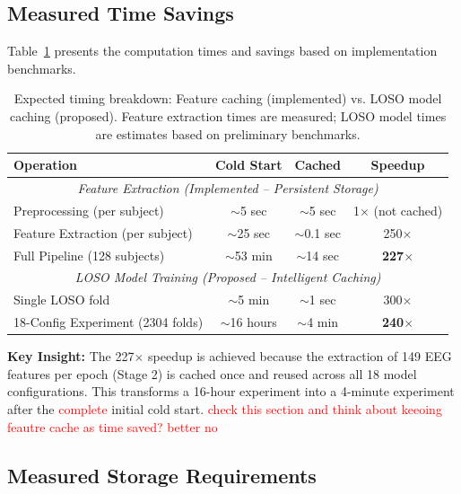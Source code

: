 \documentclass{imc-inf} %
\begin{document}
\subsection{Measured Time Savings}

Table~\ref{tab:expected_time} presents the computation times and savings based on implementation benchmarks.

\begin{table}[ht]
\centering
\begin{tabular}{|l|c|c|c|}
\hline
\textbf{Operation} & \textbf{Cold Start} & \textbf{Cached} & \textbf{Speedup} \\
\hline
\multicolumn{4}{|c|}{\textit{Feature Extraction (Implemented -- Persistent Storage)}} \\
\hline
Preprocessing (per subject) & $\sim$5 sec & $\sim$5 sec & 1$\times$ (not cached) \\
\hline
Feature Extraction (per subject) & $\sim$25 sec & $\sim$0.1 sec & 250$\times$ \\
\hline
Full Pipeline (128 subjects) & $\sim$53 min & $\sim$14 sec & \textbf{227$\times$} \\
\hline
\multicolumn{4}{|c|}{\textit{LOSO Model Training (Proposed -- Intelligent Caching)}} \\
\hline
Single LOSO fold & $\sim$5 min & $\sim$1 sec & 300$\times$ \\
\hline
18-Config Experiment (2304 folds) & $\sim$16 hours & $\sim$4 min & \textbf{240$\times$} \\
\hline
\end{tabular}
\caption{Expected timing breakdown: Feature caching (implemented) vs. LOSO model caching (proposed). Feature extraction times are measured; LOSO model times are estimates based on preliminary benchmarks.}
\label{tab:expected_time}
\end{table}

\textbf{Key Insight:} The 227$\times$ speedup is achieved because the extraction of 149 EEG features per epoch (Stage 2) is cached once and reused across all 18 model configurations. This transforms a 16-hour experiment into a 4-minute experiment after the \textcolor{red}{complete} initial cold start. \textcolor{red}{check this section and think about keeoing feautre cache as time saved? better no}

\subsection{Measured Storage Requirements}
\end{document}
